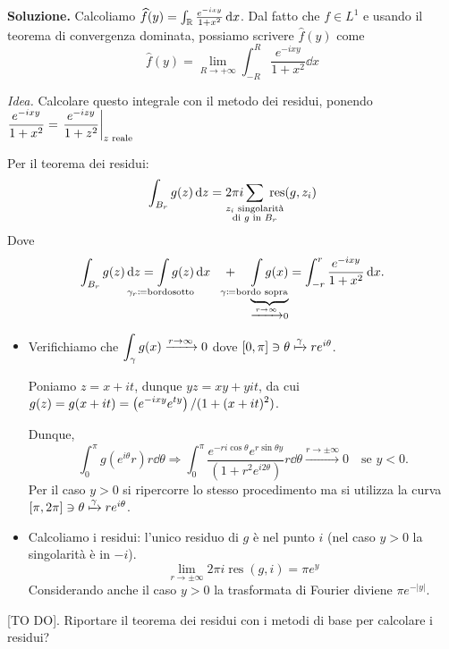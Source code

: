 \textbf{Soluzione.}
Calcoliamo $\widehat{f}(y) = \int_\mathbb R \frac{e^{-ixy}}{1 + x^2} \,\mathrm{d} x$.
Dal fatto che $f \in L^1$ e usando il teorema di convergenza dominata, possiamo scrivere $\hat{f}(y)$ come
%
$$
	\hat{f}(y) = \lim_{R \to +\infty} \int_{-R}^R \frac{e^{-ixy}}{1 + x^2} \dd x
$$
%

\textit{Idea.} Calcolare questo integrale con il metodo dei residui, ponendo $\displaystyle \frac{e^{-ixy}}{1 + x^2} = \left. \frac{e^{-izy}}{1 + z^2} \right|_{z \text{ reale}}$

Per il teorema dei residui:
%
$$
	\int_{B_r} g(z) \dd z = 2\pi i \sum_{\mathclap{\substack{z_i \text{ singolarità} \\ \text{di } g \text{ in } B_r}}} \; \operatorname{res} (g,z_i) 
$$
%
Dove
%
$$
	\int_{B_r} g(z) \dd z = \int\limits_{\mathclap{\gamma_r \coloneqq \text{bordo \\ sotto}}} g(z) \dd x \quad 
	+ \quad \underbrace{\int\limits_{\mathclap{\gamma \coloneqq \text{bordo sopra}}} g(x)}_{\xrightarrow{r \to \infty} 0}
	= \int_{-r}^{r} \frac{e^{-ixy}}{1 + x^2} \dd x.
$$
%

\begin{itemize}

	\item Verifichiamo che $\displaystyle \int_{\gamma} g(x) \xrightarrow{r \to \infty} 0$ dove $[0,\pi] \ni \theta \xmapsto{\gamma} r e^{i\theta}$.

	Poniamo $z = x + it$, dunque $yz = xy + yit$, da cui $\displaystyle g(z) = g(x + it) = \left( e^{-ixy} e^{ty} \right) / (1 + (x + it)^2)$.

	Dunque,
	$$
		\int_0^\pi g(e^{i\theta}r) r \dd \theta
		\Longrightarrow \int_0^\pi \frac{e^{-ri\cos \theta} e^{r \sin\theta y}}{(1 + r^2 e^{i2\theta})} r \dd \theta
		\xrightarrow{r \to \pm \infty} 0 \quad \text{se } y < 0. 
	$$
	Per il caso $y > 0$ si ripercorre lo stesso procedimento ma si utilizza la curva $[\pi,2\pi] \ni \theta \xmapsto{\gamma} r e^{i\theta}$.


	\item Calcoliamo i residui: l'unico residuo di $g$ è nel punto $i$ (nel caso $y > 0$ la singolarità è in $-i$).
	$$
		\lim_{r \to \pm \infty} 2\pi i \operatorname{res}(g,i) = \pi e^{y}
	$$
	Considerando anche il caso $y > 0$ la trasformata di Fourier diviene $\pi e^{-|y|}$.

\end{itemize}

[TO DO]. Riportare il teorema dei residui con i metodi di base per calcolare i residui?

